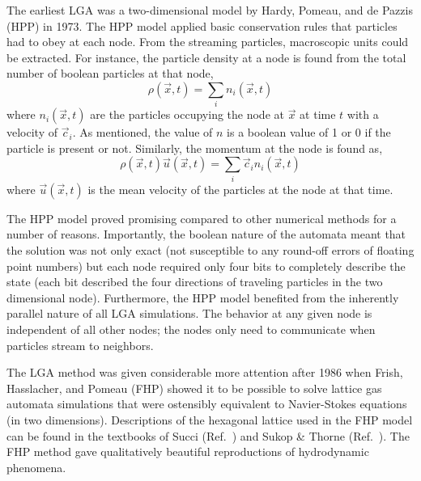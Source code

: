 The earliest LGA was a two-dimensional model by Hardy, Pomeau, and de Pazzis (HPP) in 1973.\cite{Hardy1975} The HPP model applied basic conservation rules that particles had to obey at each node. From the streaming particles, macroscopic units could be extracted. For instance, the particle density at a node is found from the total number of boolean particles at that node,
\begin{equation}
	\rho(\vec{x},t) = \sum_i n_i(\vec{x},t)
\end{equation}
where $n_i(\vec{x},t)$ are the particles occupying the node at $\vec{x}$ at time $t$ with a velocity of $\vec{c}_i$. As mentioned, the value of $n$ is a boolean value of 1 or 0 if the particle is present or not. Similarly, the momentum at the node is found as,
\begin{equation}
	\rho(\vec{x},t)\vec{u}(\vec{x},t) = \sum_i \vec{c}_in_i(\vec{x},t)
\end{equation}
where $\vec{u}(\vec{x},t)$ is the mean velocity of the particles at the node at that time.

The HPP model proved promising compared to other numerical methods for a number of reasons. Importantly, the boolean nature of the automata meant that the solution was not only exact (not susceptible to any round-off errors of floating point numbers) but each node required only four bits to completely describe the state (each bit described the four directions of traveling particles in the two dimensional node).\cite{Hardy1975} Furthermore, the HPP model benefited from the inherently parallel nature of all LGA simulations. The behavior at any given node is independent of all other nodes; the nodes only need to communicate when particles stream to neighbors.\cite{succi2001lattice}

The LGA method was given considerable more attention after 1986 when Frish, Hasslacher, and Pomeau (FHP) showed it to be possible to solve lattice gas automata simulations that were ostensibly equivalent to Navier-Stokes equations (in two dimensions).\cite{Frisch1986} Descriptions of the hexagonal lattice used in the FHP model can be found in the textbooks of Succi (Ref.~\cite{succi2001lattice}) and Sukop \& Thorne (Ref.~\cite{Sukop2007}). The FHP method gave qualitatively beautiful reproductions of hydrodynamic phenomena.


